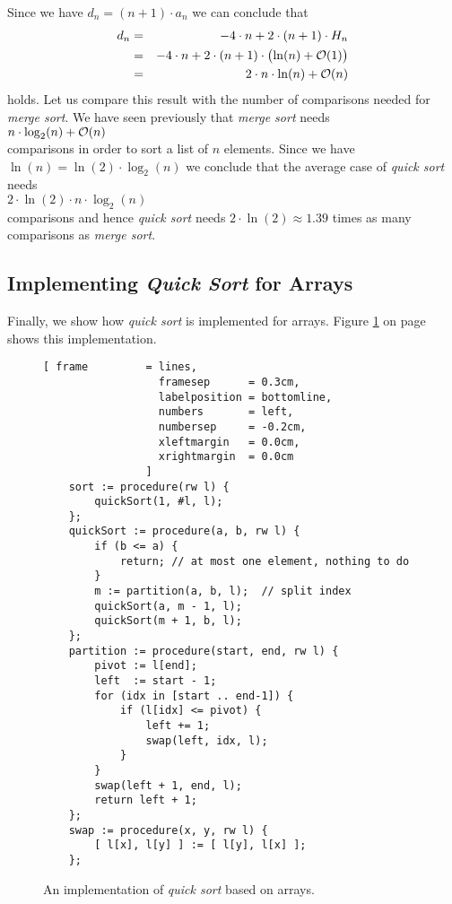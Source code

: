 Since we have $d_n = (n+1) \cdot a_{n}$ we can conclude that
\begin{eqnarray*}  
 d_n & = & -4 \cdot n + 2 \cdot(n+1) \cdot H_n \\
     & = & -4 \cdot n + 2 \cdot(n+1) \cdot \bigl(\ln(n) + \mathcal{O}(1)\bigr) \\
     & = & 2 \cdot n \cdot \ln(n) + \mathcal{O}(n)
\end{eqnarray*}
holds.  Let us compare this result with the number of comparisons needed for \emph{merge sort}.
We have seen previously that \emph{merge sort} needs
\\[0.2cm]
\hspace*{1.3cm} $n \cdot \log_2(n) + \mathcal{O}(n)$ \\[0.2cm]
comparisons in order to sort a list of $n$ elements.  Since we have $\ln(n) = \ln(2) \cdot
\log_2(n)$
we conclude that the average case of \emph{quick sort} needs
 \\[0.2cm]
\hspace*{1.3cm} $2 \cdot \ln(2) \cdot n \cdot \log_2(n)$ \\[0.2cm]
comparisons and hence \emph{quick sort} needs  $2 \cdot \ln(2) \approx 1.39$ times as many comparisons as
\emph{merge sort}.  


\subsection{Implementing \emph{Quick Sort} for Arrays}
Finally, we show how \emph{quick sort}  is implemented for arrays.  Figure
\ref{fig:quick-sort-array.stlx} on page \pageref{fig:quick-sort-array.stlx} shows this implementation. 

\begin{figure}[!ht]
  \centering
\begin{Verbatim}[ frame         = lines, 
                  framesep      = 0.3cm, 
                  labelposition = bottomline,
                  numbers       = left,
                  numbersep     = -0.2cm,
                  xleftmargin   = 0.0cm,
                  xrightmargin  = 0.0cm
                ]
    sort := procedure(rw l) {
        quickSort(1, #l, l);
    };
    quickSort := procedure(a, b, rw l) {
        if (b <= a) {
            return; // at most one element, nothing to do
        }
        m := partition(a, b, l);  // split index
        quickSort(a, m - 1, l);
        quickSort(m + 1, b, l);
    };
    partition := procedure(start, end, rw l) {
        pivot := l[end];
        left  := start - 1;
        for (idx in [start .. end-1]) {
            if (l[idx] <= pivot) {
                left += 1;
                swap(left, idx, l);
            }
        }
        swap(left + 1, end, l);
        return left + 1;
    };    
    swap := procedure(x, y, rw l) {
        [ l[x], l[y] ] := [ l[y], l[x] ];
    };
\end{Verbatim}
\vspace*{-0.3cm}
  \caption{An implementation of \emph{quick sort} based on arrays.}
  \label{fig:quick-sort-array.stlx}
\end{figure}

